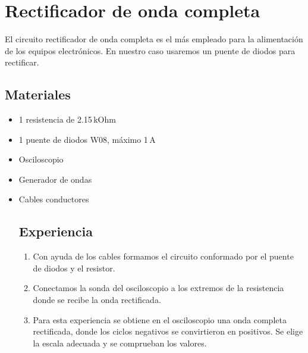 \documentclass[a4paper,12pt]{report}
\begin{document}
\section{Rectificador de onda completa}
El circuito rectificador de onda completa es el más empleado para la alimentación de los equipos electrónicos. En nuestro caso usaremos un puente de diodos para rectificar.
\subsection{Materiales}
\begin{itemize}
\item 1 resistencia de 2.15$\,$kOhm
\item 1 puente de diodos W08, máximo 1$\,$A
\item Osciloscopio
\item Generador de ondas
\item Cables conductores
\subsection{Experiencia}
\begin{enumerate}
\item Con ayuda de los cables formamos el circuito conformado por el puente de diodos y el resistor.
\item Conectamos la sonda del osciloscopio a los extremos de la resistencia donde se recibe la onda rectificada.
\item Para esta experiencia se obtiene en el osciloscopio una onda completa rectificada, donde los ciclos negativos se convirtieron en positivos. Se elige la escala adecuada y se comprueban los valores.
\end{enumerate}
\end{itemize}
\end{document}
